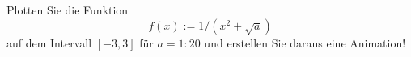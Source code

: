 \begin{aufg}[0]
Plotten Sie die Funktion \[ f(x):= 1/(x^2+\sqrt{a}) \]
auf dem Intervall $[-3,3]$ f\"ur $a=1:20$ und erstellen Sie daraus eine Animation! 
\end{aufg}